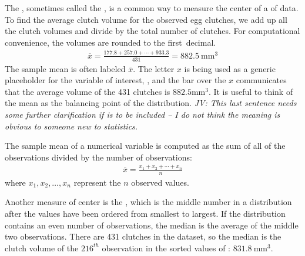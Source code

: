 \begin{doublespace}
The , sometimes called the , is a common way to measure the center of a  of data. To find the average clutch volume for the observed egg clutches, we add up all the clutch volumes and divide by the total number of clutches. For computational convenience, the volumes are rounded to the first~decimal.
\begin{eqnarray}
\overline{x} = \frac{177.8 + 257.0 + \cdots + 933.3}{431} = 882.5\ \textrm{mm}^{3}
\label{sampleMeanEquation}
\end{eqnarray}
The sample mean is often labeled $\overline{x}$. The letter $x$ is being used as a generic placeholder for the variable of interest, , and the bar over the $x$ communicates that the average volume of the 431 clutches is $882.5\textrm{mm}^{3}$. It is useful to think of the mean as the balancing point of the distribution. \textit{JV: This last sentence needs some further clarification if is to be included -- I do not think the meaning is obvious to someone new to statistics.}

\begin{termBox}{%
		The sample mean of a numerical variable is computed as the sum of all of the observations divided by the number of observations:
		\begin{eqnarray}
		\overline{x} = \frac{x_1+x_2+\cdots+x_n}{n}
		\label{meanEquation}
		\end{eqnarray}
		where $x_1, x_2, \dots, x_n$ represent the $n$ observed values.}
\end{termBox}

Another measure of center is the , which is the middle number in a distribution after the values have been ordered from smallest to largest. If the distribution contains an even number of observations, the median is the average of the middle two observations. There are 431 clutches in the dataset, so the median is the clutch volume of the $216^{th}$ observation in the sorted values of : $831.8\ \textrm{mm}^{3}$.



\end{doublespace}

